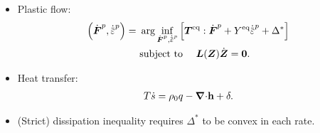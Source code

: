 \begin{frame}
\begin{columns}[T]
\begin{column}{0.4\textwidth}
\begin{itemize}
        \item<5-> Plastic flow:
        \begin{align*}
          \left( \dot{\defgrad}^p, \epdot \right) = & \ \arg\inf_{\dot{\defgrad}^p, \epdot} \left[ \bfT^\text{eq}:\dot{\defgrad}^p + Y^\text{eq}\epdot + \Delta^* \right] \\
                                                    & \ \text{subject to }\quad \bfL(\bfZ)\dot{\bfZ} = \bs{0}.                                                            
        \end{align*}
        \item<6-> Heat transfer:
        \begin{align*}
          T\dot{s} = \rho_0 q - {\boldsymbol{\nabla} \cdot} \textbf{h} + \delta.
        \end{align*}
        \item<7-> (Strict) dissipation inequality requires $\Delta^*$ to be convex in each rate.
      \end{itemize}
      
      
    \end{column}
  \end{columns}
\end{frame}
